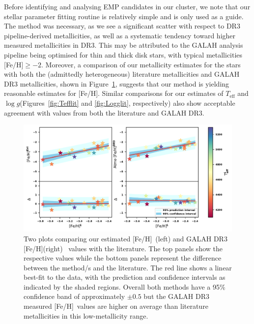 \documentclass[]{aastex631}
\newcommand{\g}{GALAH\xspace}
\newcommand{\logg}{\ensuremath{\log g}\xspace}
\newcommand{\teff}{\ensuremath{T_{\mathrm{eff}}}\xspace}
\newcommand{\feh}{[Fe/H]\xspace}
\begin{document}
Before identifying and analysing EMP candidates in our cluster, we note that our stellar parameter fitting routine is relatively simple and is only used as a guide. The method was necessary, as we see a significant scatter with respect to DR3 pipeline-derived metallicities, as well as a systematic tendency toward higher measured metallicities in DR3. This may be attributed to the GALAH analysis pipeline being optimised for thin and thick disk stars, with typical metallicities \feh $\geq -2$. Moreover, a comparison of our metallicity estimates for the stars with both the (admittedly heterogeneous) literature metallicities and \g DR3 metallicities, shown in Figure~\ref{fig:Fehlit}, suggests that our method is yielding reasonable estimates for \feh. Similar comparisons for our estimates of \teff and \logg (Figures~\ref{fig:Tefflit} and \ref{fig:Logglit}, respectively) also show acceptable agreement with values from both the literature and \g DR3. 

\begin{figure}
\includegraphics[width=\linewidth,keepaspectratio]{Plots/Figure7.pdf}
\caption{Two plots comparing our estimated \feh \ (left) and GALAH DR3  \feh (right) \ values with the literature. The top panels show the respective values while the bottom panels represent the difference between the method/s and the literature. The red line shows a linear best-fit to the data, with the prediction and confidence intervals as indicated by the shaded regions. Overall both methods have a 95\% confidence band of approximately $ \mathrm{\pm 0.5}$ but the GALAH DR3 measured \feh \ values are higher on average than literature metallicities in this low-metallicity range.}
\label{fig:Fehlit}
\end{figure}
\end{document}
